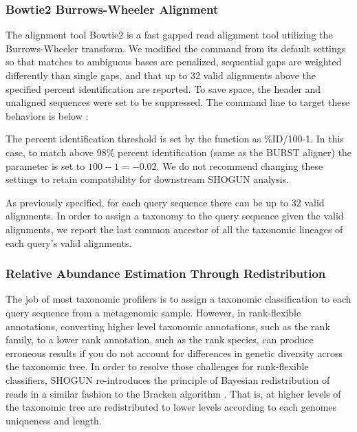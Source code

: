 \subsubsection{Bowtie2 Burrows-Wheeler Alignment}

The alignment tool Bowtie2 \cite{langmead_fast_2012} is a fast gapped read alignment tool utilizing the Burrows-Wheeler transform. We modified the  command from its default settings so that matches to ambiguous bases are penalized, sequential gaps are weighted differently than single gaps, and that up to 32 valid alignments above the specified percent identification are reported. To save space, the header and unaligned sequences were set to be suppressed. The command line to target these behaviors is below \cite{al-ghalith_ninja-ops:_2016}:

\begin{center}
\end{center}

The percent identification threshold is set by the  function  as \%ID/100-1. In this case, to match above 98\% percent identification (same as the BURST aligner) the parameter  is set to $100-1=-0.02$. We do not recommend changing these settings to retain compatibility for downstream SHOGUN analysis.

As previously specified, for each query sequence there can be up to 32 valid alignments. In order to assign a taxonomy to the query sequence given the valid alignments, we report the last common ancestor of all the taxonomic lineages of each query's valid alignments.

\subsubsection{Relative Abundance Estimation Through Redistribution}

The job of most taxonomic profilers is to assign a taxonomic classification to each query sequence from a metagenomic sample. However, in rank-flexible annotations, converting higher level taxonomic annotations, such as the rank family, to a lower rank annotation, such as the rank species, can produce erroneous results if you do not account for differences in genetic diversity across the taxonomic tree. In order to resolve those challenges for rank-flexible classifiers, SHOGUN re-introduces the principle of Bayesian redistribution of reads in a similar fashion to the Bracken algorithm \cite{lu_bracken:_2017}. That is, at higher levels of the taxonomic tree are redistributed to lower levels according to each genomes uniqueness and length.


